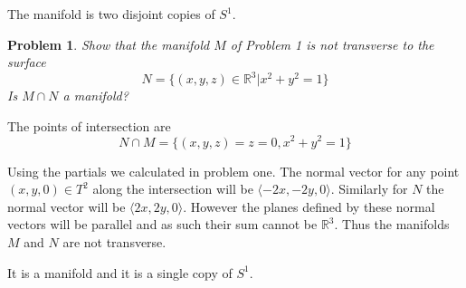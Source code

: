\documentclass[10pt]{article}
\newcommand{\sk}{\vskip10mm}
\newcommand{\bb}[1]{\mathbb{#1}}
\theoremstyle{plain}
\newtheorem{problem}{Problem}
\theoremstyle{remark}
\begin{document}
The manifold is two disjoint copies of $S^1$.
\sk

\begin{problem}
  Show that the manifold $M$ of Problem 1 is not transverse to the surface
  \[
    N=\{(x,y,z)\in\bb{R}^3|x^2+y^2=1\}
  \]
  Is $M\cap N$ a manifold?
\end{problem}

The points of intersection are
\[
  N\cap M = \{(x,y,z)=z=0,x^2+y^2=1\}
\]

Using the partials we calculated in problem one. The normal vector for
any point $(x,y,0)\in T^2$ along the intersection will be $\langle-2x,-2y,0 \rangle$.
Similarly for $N$ the normal vector will be $\langle 2x,2y,0\rangle$. However the
planes defined by these normal vectors will be parallel and as such their
sum cannot be $\bb{R}^3$. Thus the manifolds $M$ and $N$ are not transverse.

It is a manifold and it is a single copy of $S^1$.

\end{document}

